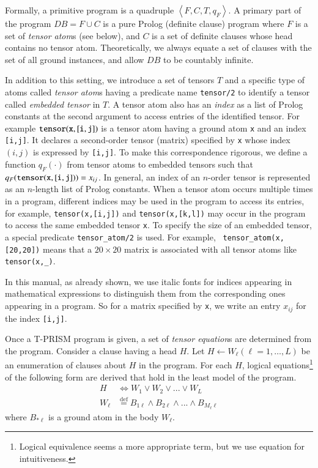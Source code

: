 \documentclass[a4paper]{report}
\newcommand{\db}{\mathit{DB}}
\newcommand{\defeq}{\ensuremath{\stackrel{\mathrm{def}}{=}}}
\begin{document}
Formally,   a   primitive   program    is   a   quadruple   $\left\langle
F,C,T,q_F\right\rangle$. A primary part of the program $\db=F \cup C $
is a pure Prolog (definite clause) program  where $F$ is a set of {\em
	tensor atom\/}s  (see below),  and $C$  is a  set of  definite clauses
whose head contains no tensor  atom. Theoretically, we always equate a
set of clauses  with the set of all ground  instances, and allow $\db$
to be countably infinite.

In addition to this  setting, we introduce a set of  tensors $T$ and a
specific type of atoms called  {\em tensor atom\/}s having a predicate
name  {\tt  tensor/2}  to  identify  a  tensor  called  {\em  embedded
	tensor\/} in $T$.  A  tensor atom also has an {\em  index\/} as a list
of Prolog  constants at the second  argument to access entries  of the
identified tensor.   For example  ${\tt tensor(x,[i,j])}$ is  a tensor
atom  having a  ground  atom {\tt  x}  and an  index  {\tt [i,j]}.  It
declares a  second-order tensor  (matrix) specified  by {\tt  x} whose
index $(i,j)$ is expressed by {\tt [i,j]}. To make this correspondence
rigorous,  we define  a  function $q_F(\cdot)$  from  tensor atoms  to
embedded  tensors such  that  $q_F({\tt tensor(x,[i,j])})=x_{ij}$.  In
general,  an  index  of  an  $n$-order tensor  is  represented  as  an
$n$-length  list  of  Prolog  constants. When  a  tensor  atom  occurs
multiple times  in a  program, different  indices may  be used  in the
program to access its entries,  for example, {\tt tensor(x,[i,j])} and
{\tt  tensor(x,[k,l])} may  occur in  the program  to access  the same
embedded tensor {\tt x}.  To specify the size of an embedded tensor, a
special  predicate {\tt  tensor\_atom/2}  is used.  For example,  {\tt
	tensor\_atom(x,[20,20])}  means  that  a  $20  \times  20$  matrix  is
associated with all tensor atoms like {\tt tensor(x,\_)}.

In  this manual,  as already  shown, we  use italic  fonts for  indices
appearing  in mathematical  expressions to  distinguish them  from the
corresponding ones appearing  in a program. So for  a matrix specified
by {\tt x}, we write an entry $x_{ij}$ for the index {\tt [i,j]}.

Once a T-PRISM program is given, a set of {\it tensor equation\/}s are
determined from the program. Consider a  clause having a head $H$. Let
$H  \leftarrow  W_{\ell}  (\ell  =1,\ldots,L)$ be  an  enumeration  of
clauses   about  $H$   in   the  program.   For   each  $H$,   logical
equations\footnote{
	Logical equivalence seems a more appropriate term, but we use equation
	for intuitiveness.
} of the following form are derived that hold in the least model of
the program.
%
\begin{align} \nonumber
H &\Leftrightarrow W_{1} \vee W_{2} \vee ... \vee W_{L} \\
W_{\ell} &\defeq B_{1\ell} \wedge B_{2\ell} \wedge ... \wedge B_{M_\ell \ell}
\label{eq:logic_eqs}
\end{align}
%
where $B_{*\ell}$ is a ground atom in the body $W_{\ell}$.
\end{document}
